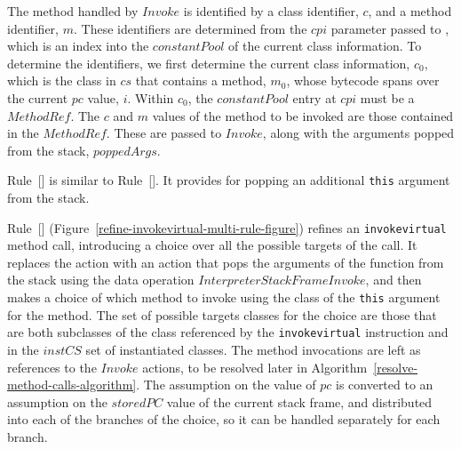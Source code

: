 The method handled by $Invoke$ is identified by a class identifier,
$c$, and a method identifier, $m$.
These identifiers are determined from the $cpi$ parameter passed to
, which is an index into the
$constantPool$ of the current class information.
To determine the identifiers, we first determine the current class
information, $c_0$, which is the class in $cs$ that contains a method,
$m_0$, whose bytecode spans over the current $pc$ value, $i$.
Within $c_0$, the $constantPool$ entry at $cpi$ must be a $MethodRef$.
The $c$ and $m$ values of the method to be invoked are those contained
in the $MethodRef$.
These are passed to $Invoke$, along with the arguments popped from the
stack, $poppedArgs$.

Rule~[] is similar to
Rule~[].
It provides for popping an additional \texttt{this} argument from the
stack.

Rule~[]
(Figure~\ref{refine-invokevirtual-multi-rule-figure}) refines an
\texttt{invokevirtual} method call, introducing a choice over all the
possible targets of the call.
It replaces the action  with an
action that pops the arguments of the function from the stack using
the data operation $InterpreterStackFrameInvoke$, and then makes a
choice of which method to invoke using the class of the \texttt{this}
argument for the method.
The set of possible targets classes for the choice are those that are
both subclasses of the class referenced by the \texttt{invokevirtual}
instruction and in the $instCS$ set of instantiated classes.
The method invocations are left as references to the $Invoke$ actions,
to be resolved later in
Algorithm~\ref{resolve-method-calls-algorithm}.
The assumption on the value of $pc$ is converted to an assumption on
the $storedPC$ value of the current stack frame, and distributed into
each of the branches of the choice, so it can be handled separately
for each branch.

